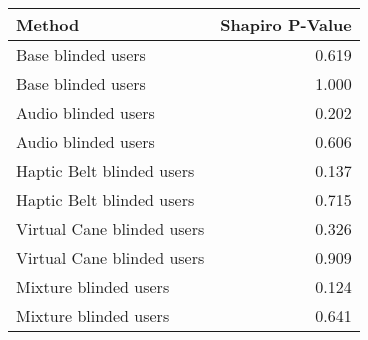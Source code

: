 
\centering
\begin{tabular}{lr}
\toprule
                    Method &  Shapiro P-Value \\
\midrule
        Base blinded users &            0.619 \\
        Base blinded users &            1.000 \\
       Audio blinded users &            0.202 \\
       Audio blinded users &            0.606 \\
 Haptic Belt blinded users &            0.137 \\
 Haptic Belt blinded users &            0.715 \\
Virtual Cane blinded users &            0.326 \\
Virtual Cane blinded users &            0.909 \\
     Mixture blinded users &            0.124 \\
     Mixture blinded users &            0.641 \\
\bottomrule
\end{tabular}
